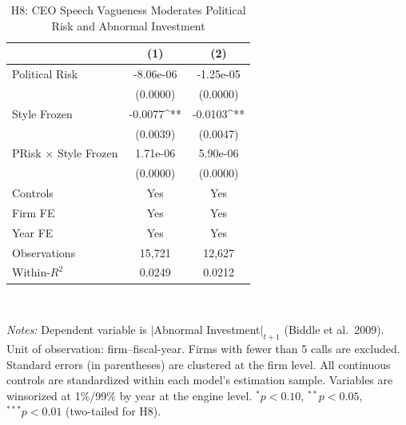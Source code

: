 \begin{table}[htbp]
\centering
\caption{H8: CEO Speech Vagueness Moderates Political Risk and Abnormal Investment}
\label{tab:h8_political_risk}
\small
\begin{tabular}{lcc}
\toprule
 & (1) & (2) \\
\midrule
Political Risk & -8.06e-06 & -1.25e-05 \\
 & (0.0000) & (0.0000) \\
Style Frozen & -0.0077^{**} & -0.0103^{**} \\
 & (0.0039) & (0.0047) \\
PRisk $\times$ Style Frozen & 1.71e-06 & 5.90e-06 \\
 & (0.0000) & (0.0000) \\
\midrule
Controls & Yes & Yes \\
Firm FE  & Yes & Yes \\
Year FE  & Yes & Yes \\
\midrule
Observations & 15,721 & 12,627 \\
Within-$R^2$ & 0.0249 & 0.0212 \\
\bottomrule
\end{tabular}
\\[-0.5em]
\parbox{\textwidth}{\scriptsize 
\textit{Notes:} Dependent variable is $|$Abnormal Investment$|_{t+1}$ (Biddle et al.\ 2009). Unit of observation: firm--fiscal-year. Firms with fewer than 5 calls are excluded. Standard errors (in parentheses) are clustered at the firm level. All continuous controls are standardized within each model's estimation sample. Variables are winsorized at 1\%/99\% by year at the engine level. $^{*}p<0.10$, $^{**}p<0.05$, $^{***}p<0.01$ (two-tailed for H8).
}
\end{table}